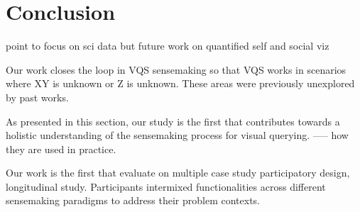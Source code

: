 \section{Conclusion\label{sec:conclusion}}
point to focus on sci data but future work on quantified self and social viz


Our work closes the loop in VQS sensemaking so that VQS works in scenarios  where XY is unknown or Z is unknown. These areas were previously unexplored by past works.

As presented in this section, our study is the first that contributes towards a holistic understanding of the sensemaking process for visual querying.
----- how they are used in practice. %

Our work is the first that evaluate on multiple case study participatory design, longitudinal study. 
Participants intermixed functionalities across different sensemaking paradigms to address their problem contexts.
